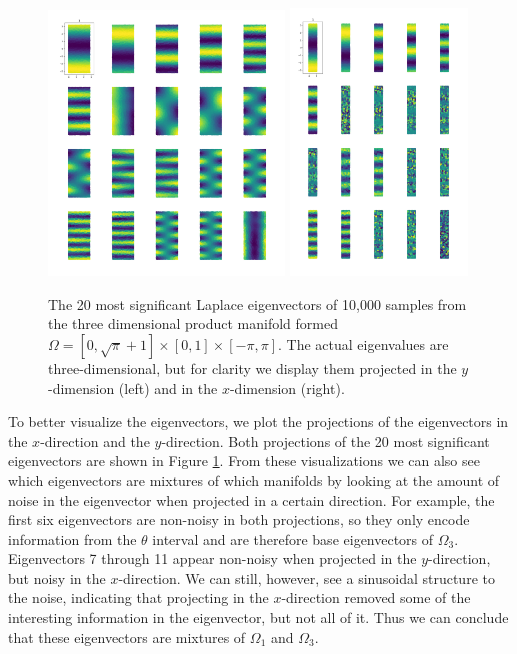 \documentclass{article}
\numberwithin{equation}{section}
\theoremstyle{definition}
\begin{document}
\begin{figure}[ht]
    \centering
    \includegraphics[width=0.56\textwidth]{images/rect_circle_eigenvalues_20_(1,3).png}
    \includegraphics[width=0.42\textwidth]{images/rect_circle_eigenvalues_20_(2,3).png}
    \caption{The 20 most significant Laplace eigenvectors of 10,000 samples from the three dimensional product manifold formed $\Omega = [0, \sqrt{\pi} + 1] \times [0,1] \times [-\pi, \pi]$. The actual eigenvalues are three-dimensional, but for clarity we display them projected in the $y$-dimension (left) and in the $x$-dimension (right).}
    \label{fig:3d-all-eigenvecs}
\end{figure}

To better visualize the eigenvectors, we plot the projections of the eigenvectors in the $x$-direction and the $y$-direction. Both projections of the 20 most significant eigenvectors are shown in Figure \ref{fig:3d-all-eigenvecs}. From these visualizations we can also see which eigenvectors are mixtures of which manifolds by looking at the amount of noise in the eigenvector when projected in a certain direction. For example, the first six eigenvectors are non-noisy in both projections, so they only encode information from the $\theta$ interval and are therefore base eigenvectors of $\Omega_3$. Eigenvectors 7 through 11 appear non-noisy when projected in the $y$-direction, but noisy in the $x$-direction. We can still, however, see a sinusoidal structure to the noise, indicating that projecting in the $x$-direction removed some of the interesting information in the eigenvector, but not all of it. Thus we can conclude that these eigenvectors are mixtures of $\Omega_1$ and $\Omega_3$.
\end{document}
